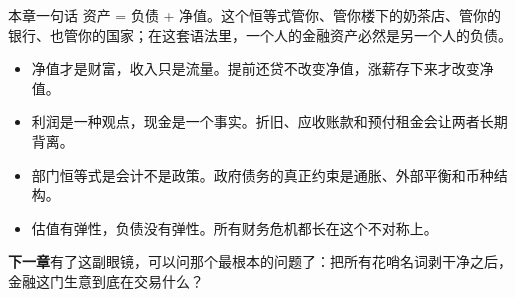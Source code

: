\begin{takeaway}{本章一句话}
资产 = 负债 + 净值。这个恒等式管你、管你楼下的奶茶店、管你的银行、也管你的国家；在这套语法里，一个人的金融资产必然是另一个人的负债。

\begin{itemize}
  \item 净值才是财富，收入只是流量。提前还贷不改变净值，涨薪存下来才改变净值。
  \item 利润是一种观点，现金是一个事实。折旧、应收账款和预付租金会让两者长期背离。
  \item 部门恒等式是会计不是政策。政府债务的真正约束是通胀、外部平衡和币种结构。
  \item 估值有弹性，负债没有弹性。所有财务危机都长在这个不对称上。
\end{itemize}

\end{takeaway}

\begin{bridgebox}
\textbf{下一章}有了这副眼镜，可以问那个最根本的问题了：把所有花哨名词剥干净之后，金融这门生意到底在交易什么？
\end{bridgebox}

